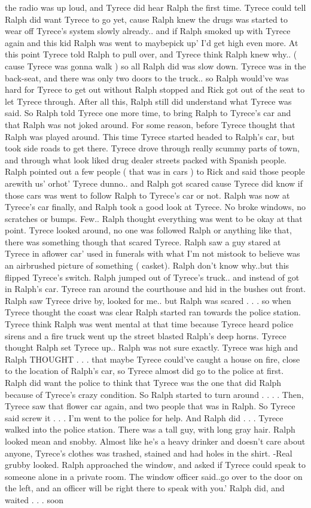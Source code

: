 \documentclass[12pt]{book}
\begin{document}
the radio was up loud, and Tyrece did hear Ralph the first time. Tyrece could tell Ralph did want Tyrece to go yet, cause Ralph knew the drugs was started to wear off Tyrece's system slowly already.. and if Ralph smoked up with Tyrece again and this kid Ralph was went to maybepick up' I'd get high even more. At this point Tyrece told Ralph to pull over, and Tyrece think Ralph knew why.. ( cause Tyrece was gonna walk ) so all Ralph did was slow down. Tyrece was in the back-seat, and there was only two doors to the truck.. so Ralph would've was hard for Tyrece to get out without Ralph stopped and Rick got out of the seat to let Tyrece through. After all this, Ralph still did understand what Tyrece was said. So Ralph told Tyrece one more time, to bring Ralph to Tyrece's car and that Ralph was not joked around. For some reason, before Tyrece thought that Ralph was played around. This time Tyrece started headed to Ralph's car, but took side roads to get there. Tyrece drove through really scummy parts of town, and through what look liked drug dealer streets packed with Spanish people. Ralph pointed out a few people ( that was in cars ) to Rick and said those people arewith us' orhot' Tyrece dunno.. and Ralph got scared cause Tyrece did know if those cars was went to follow Ralph to Tyrece's car or not. Ralph was now at Tyrece's car finally, and Ralph took a good look at Tyrece. No broke windows, no scratches or bumps. Few.. Ralph thought everything was went to be okay at that point. Tyrece looked around, no one was followed Ralph or anything like that, there was something though that scared Tyrece. Ralph saw a guy stared at Tyrece in aflower car' used in funerals with what I'm not mistook to believe was an airbrushed picture of something ( casket). Ralph don't know why..but this flipped Tyrece's switch. Ralph jumped out of Tyrece's truck.. and instead of got in Ralph's car. Tyrece ran around the courthouse and hid in the bushes out front. Ralph saw Tyrece drive by, looked for me.. but Ralph was scared . . .  so when Tyrece thought the coast was clear Ralph started ran towards the police station. Tyrece think Ralph was went mental at that time because Tyrece heard police sirens and a fire truck went up the street blasted Ralph's deep horns. Tyrece thought Ralph set Tyrece up.. Ralph was not sure exactly. Tyrece was high and Ralph THOUGHT . . .  that maybe Tyrece could've caught a house on fire, close to the location of Ralph's car, so Tyrece almost did go to the police at first. Ralph did want the police to think that Tyrece was the one that did Ralph because of Tyrece's crazy condition. So Ralph started to turn around . . .  . Then, Tyrece saw that flower car again, and two people that was in Ralph. So Tyrece said screw it . . .  I'm went to the police for help. And Ralph did . . .  Tyrece walked into the police station. There was a tall guy, with long gray hair. Ralph looked mean and snobby. Almost like he's a heavy drinker and doesn't care about anyone, Tyrece's clothes was trashed, stained and had holes in the shirt. -Real grubby looked. Ralph approached the window, and asked if Tyrece could speak to someone alone in a private room. The window officer said..go over to the door on the left, and an officer will be right there to speak with you.' Ralph did, and waited . . .  soon 
\end{document}
